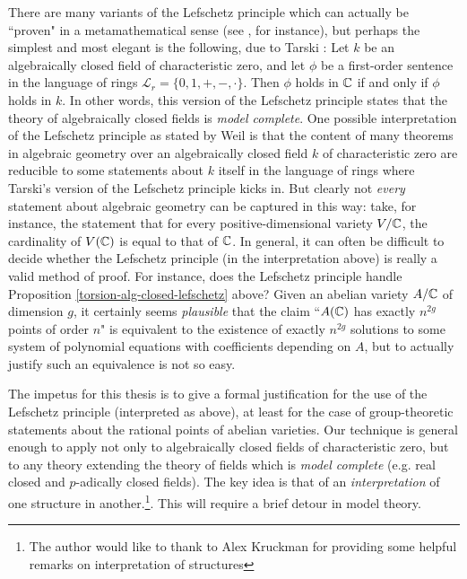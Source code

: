 There are many variants of the Lefschetz principle which can actually be ``proven" in a metamathematical sense (see \cite{barwise1969lefschetz}, for instance), but perhaps the simplest and most elegant is the following, due to Tarski \cite{tarski1951decision}: Let $k$ be an algebraically closed field of characteristic zero, and let $\phi$ be a first-order sentence in the language of rings $\mathcal{L}_r=\{0,1,+,-,\cdot\}$. Then $\phi$ holds in $\mathbb{C}$ if and only if $\phi$ holds in $k$. In other words, this version of the Lefschetz principle states that the theory of algebraically closed fields is \emph{model complete}. One possible interpretation of the Lefschetz principle as stated by Weil is that the content of many theorems in algebraic geometry over an algebraically closed field $k$ of characteristic zero are reducible to some statements about $k$ itself in the language of rings where Tarski's version of the Lefschetz principle kicks in. But clearly not \emph{every} statement about algebraic geometry can be captured in this way: take, for instance, the statement that for every positive-dimensional variety $V/\mathbb{C}$, the cardinality of $V(\mathbb{C})$ is equal to that of $\mathbb{C}$. In general, it can often be difficult to decide whether the Lefschetz principle (in the interpretation above) is really a valid method of proof. For instance, does the Lefschetz principle handle Proposition \ref{torsion-alg-closed-lefschetz} above? Given an abelian variety $A/\mathbb{C}$ of dimension $g$, it certainly seems \emph{plausible} that the claim ``$A(\mathbb{C})$ has exactly $n^{2g}$ points of order $n$" is equivalent to the existence of exactly $n^{2g}$ solutions to some system of polynomial equations with coefficients depending on $A$, but to actually justify such an equivalence is not so easy.

The impetus for this thesis is to give a formal justification for the use of the Lefschetz principle (interpreted as above), at least for the case of group-theoretic statements about the rational points of abelian varieties. Our technique is general enough to apply not only to algebraically closed fields of characteristic zero, but to any theory extending the theory of fields which is \emph{model complete} (e.g. real closed and $p$-adically closed fields). The key idea is that of an \emph{interpretation} of one structure in another.\footnote{The author would like to thank to Alex Kruckman for providing some helpful remarks on interpretation of structures}. This will require a brief detour in model theory.


